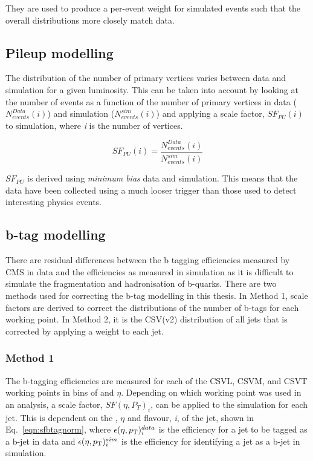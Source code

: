 They are used to produce a per-event weight for simulated events such that the overall distributions more closely match data. 


\subsection{Pileup modelling}
\label{sec:pile-up}
The distribution of the number of primary vertices varies between data and simulation for a given luminosity. This can be taken into account by looking at the number of events as a function of the number of primary vertices in data (${N_{events}^{Data}(i)}$) and simulation (${N_{events}^{sim}(i)}$) and applying a scale factor, $SF_{PU}\left( i \right)$ to simulation, where \emph{i} is the number of vertices.

\begin{equation}
SF_{PU}\left( i \right) = \frac{N_{events}^{Data}(i)}{N_{events}^{sim}(i)} 
\label{eqn:PUSF}
\end{equation}

$SF_{PU}$ is derived using \emph{minimum bias} data and simulation. This means that the data have been collected using a much looser trigger than those used to detect interesting physics events. 

\subsection{b-tag modelling ~\label{sec:btagModelling}}
There are residual differences between the b tagging efficiencies measured by CMS in data and the efficiencies as measured in simulation as it is difficult to simulate the fragmentation and hadronisation of b-quarks. There are two methods used for correcting the b-tag modelling in this thesis. In Method 1, scale factors are derived to correct the distributions of the number of b-tags for each working point. In Method 2, it is the CSV(v2) distribution of all jets that is corrected by applying a weight to each jet.

\subsubsection{Method 1 ~\label{subsec:method1btag}}

The b-tagging efficiencies are measured for each of the CSVL, CSVM, and CSVT working points in bins of \pt and $\eta$. Depending on which working point was used in an analysis, a scale factor, $SF(\eta, P_{T})_{i}$,  can be applied to the simulation for each jet. This is dependent on the \pt, $\eta$ and flavour, \emph{i}, of the jet, shown in Eq.~\ref{eqn:sfbtagnorm}, where $\epsilon(\eta , p_{\mathrm{T}})^{data}_{i}$ is the efficiency for a jet to be tagged as a b-jet in data and $\epsilon(\eta , p_{\mathrm{T}})^{sim}_{i}$ is the efficiency for identifying a jet as a b-jet in simulation.

